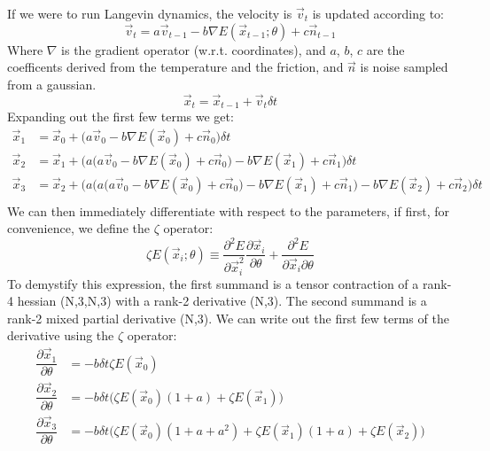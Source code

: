 \documentclass{article}
\begin{document}
If we were to run Langevin dynamics, the velocity is $\vec{v}_t$ is updated according to:
\begin{equation}
\vec{v}_t = a \vec{v}_{t-1} - b \nabla E(\vec{x}_{t-1};\theta) + c \vec{n}_{t-1}
\end{equation}
Where $\nabla$ is the gradient operator (w.r.t. coordinates), and $a$, $b$, $c$ are the coefficents derived from the temperature and the friction, and $\vec{n}$ is noise sampled from a gaussian.
\begin{equation}
\vec{x}_{t} = \vec{x}_{t-1} + \vec{v}_{t} \delta t
\end{equation}
Expanding out the first few terms we get:
\begin{equation}
\begin{split}
\vec{x}_1  &= \vec{x}_0 + \big(a \vec{v}_0 - b \nabla E(\vec{x}_0) + c \vec{n}_0  \big) \delta t \\
\vec{x}_2  &= \vec{x}_1 + \bigg( a \Big( a \vec{v}_0 - b \nabla E(\vec{x}_0) + c \vec{n}_0 \Big) - b \nabla E(\vec{x}_1) + c \vec{n}_1 \bigg) \delta t \\
\vec{x}_3  &= \vec{x}_2 + \Bigg(a\bigg(a \Big( a \vec{v}_0 - b \nabla E(\vec{x}_0) + c \vec{n}_0 \Big) - b \nabla E(\vec{x}_1) + c \vec{n}_1 \bigg) - b \nabla E(\vec{x}_2) + c \vec{n}_2 \Bigg) \delta t \\
\end{split}
\end{equation}
We can then immediately differentiate with respect to the parameters, if first, for convenience, we define the $\zeta$ operator:
\begin{equation}
\zeta E(\vec{x}_i; \theta) \equiv \dfrac{\partial^2E}{\partial\vec{x}_i^2}\dfrac{\partial\vec{x}_i}{\partial\theta} +  \dfrac{\partial^2 E}{\partial \vec{x}_i \partial \theta} 
\end{equation}
To demystify this expression, the first summand is a tensor contraction of a rank-4 hessian (N,3,N,3) with a rank-2 derivative (N,3). The second summand is a rank-2 mixed partial derivative (N,3). We can write out the first few terms of the derivative using the $\zeta$ operator:
\begin{equation}
\begin{split}
\dfrac{\partial\vec{x}_1}{\partial\theta}  &= - b\delta t \zeta E(\vec{x}_0) \\
\dfrac{\partial\vec{x}_2}{\partial\theta}  &= - b\delta t \Big(\zeta E(\vec{x}_0)(1+a)+\zeta E(\vec{x}_1)\Big)\\
\dfrac{\partial\vec{x}_3}{\partial\theta}  &= - b\delta t \Big(\zeta E(\vec{x}_0)(1+a+a^2)+\zeta E(\vec{x}_1)(1+a)+\zeta E(\vec{x}_2)\Big)\\
\end{split}
\end{equation}
\end{document}
